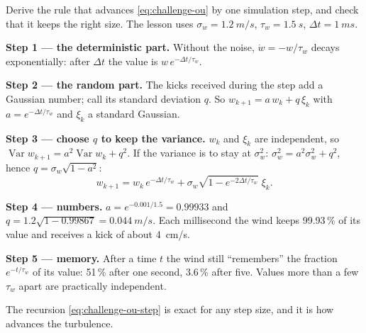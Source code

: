 \begin{example}
\label{ex:challenge-ou}
Derive the rule that advances \cref{eq:challenge-ou} by one simulation step, and check that it keeps the right size. The lesson uses $\sigma_w = \SI{1.2}{m/s}$, $\tau_w = \SI{1.5}{s}$, $\Delta t = \SI{1}{ms}$.

\textbf{Step 1 — the deterministic part.} Without the noise, $\dot w = -w/\tau_w$ decays exponentially: after $\Delta t$ the value is $w\,e^{-\Delta t/\tau_w}$.

\textbf{Step 2 — the random part.} The kicks received during the step add a Gaussian number; call its standard deviation $q$. So $w_{k+1} = a\,w_k + q\,\xi_k$ with $a = e^{-\Delta t/\tau_w}$ and $\xi_k$ a standard Gaussian.

\textbf{Step 3 — choose $q$ to keep the variance.} $w_k$ and $\xi_k$ are independent, so $\operatorname{Var}w_{k+1} = a^2\operatorname{Var}w_k + q^2$. If the variance is to stay at $\sigma_w^2$: $\sigma_w^2 = a^2\sigma_w^2 + q^2$, hence $q = \sigma_w\sqrt{1 - a^2}$:
\begin{equation}\label{eq:challenge-ou-step}
  w_{k+1} = w_k\,e^{-\Delta t/\tau_w} + \sigma_w\sqrt{1 - e^{-2\Delta t/\tau_w}}\;\xi_k .
\end{equation}

\textbf{Step 4 — numbers.} $a = e^{-0.001/1.5} = 0.99933$ and $q = 1.2\sqrt{1 - 0.99867} = \SI{0.044}{m/s}$. Each millisecond the wind keeps 99.93\,\% of its value and receives a kick of about \SI{4}{cm/s}.

\textbf{Step 5 — memory.} After a time $t$ the wind still \enquote{remembers} the fraction $e^{-t/\tau_w}$ of its value: 51\,\% after one second, 3.6\,\% after five. Values more than a few $\tau_w$ apart are practically independent.
\end{example}

The recursion \eqref{eq:challenge-ou-step} is exact for any step size, and it is how  advances the turbulence.

